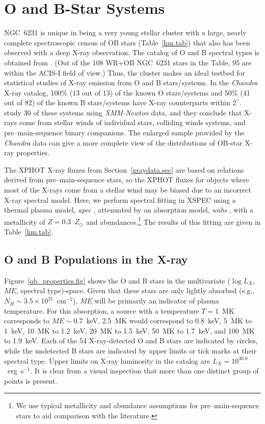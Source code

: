 \documentclass[twocolumn,tighten]{aastex61}
\begin{document}
\section{O and B-Star Systems \label{ob.sec}}

NGC~6231 is unique in being a very young stellar cluster with a large, nearly complete spectroscopic census of OB stars (Table~\ref{hm.tab}) that also has been observed with a deep X-ray observation. The catalog of O and B spectral types is obtained from \citet{2006MNRAS.372..661S}. (Out of the 108 WR+OB NGC~6231 stars in the Table, 95 are within the ACIS-I field of view.) Thus, the cluster makes an ideal testbed for statistical studies of X-ray emission from O and B stars/systems. In the {\it Chandra} X-ray catalog, 100\% (13 out of 13) of the known O stars/systems and 50\% (41 out of 82) of the known B stars/systems have X-ray counterparts within 2$^{\prime\prime}$. \citet{2006MNRAS.372..661S} study 30 of these systems using {\it XMM-Newton} data, and they conclude that X-rays come from stellar winds of individual stars, colliding winds systems, and pre--main-sequence binary companions. The enlarged sample provided by the {\it Chandra} data can give a more complete view of the distributions of OB-star X-ray properties.

The XPHOT X-ray fluxes from Section~\ref{xraydata.sec} are based on relations derived from pre--main-sequence stars, so the XPHOT fluxes for objects where most of the X-rays come from a stellar wind may be biased due to an incorrect X-ray spectral model. Here, we perform spectral fitting in XSPEC using a thermal plasma model, {\it apec} \citep{2001ApJ...556L..91S}, attenuated by an absorption model, {\it wabs} \citep{1983ApJ...270..119M}, with a metallicity of $Z=0.3$~$Z_\odot$ and \citet{1989GeCoA..53..197A} abundances.\footnote{We use typical metallicity and abundance assumptions for pre--main-sequence stars \citep[e.g.,][]{2005ApJS..160..319G} to aid comparison with the literature.} The results of this fitting are given in Table~\ref{hm.tab}. 

\subsection{O and B Populations in the X-ray \label{obxray.sec}}

Figure~\ref{ob_properties.fig} shows the O and B stars in the multivariate ($\log L_X$, $ME$, spectral type)-space. Given that these stars are only lightly absorbed (e.g., $N_H\sim3.5\times10^{21}$~cm$^{-2}$), $ME$ will be primarily an indicator of plasma temperature. For this absorption, a source with a temperature $T=1$~MK corresponds to $ME\sim0.7$~keV, 2.5~MK would correspond to 0.8~keV, 5~MK to 1~keV, 10~MK to 1.2~keV, 20~MK to 1.5~keV, 50~MK to 1.7~keV, and 100~MK to 1.9~keV. Each of the 54 X-ray-detected O and B stars are indicated by circles, while the undetected B stars are indicated by upper limits or tick marks at their spectral type. Upper limits on X-ray luminosity in the catalog are $L_X=10^{30.0}$~erg~s$^{-1}$. It is clear from a visual inspection that more than one distinct group of points is present. 
\end{document}
